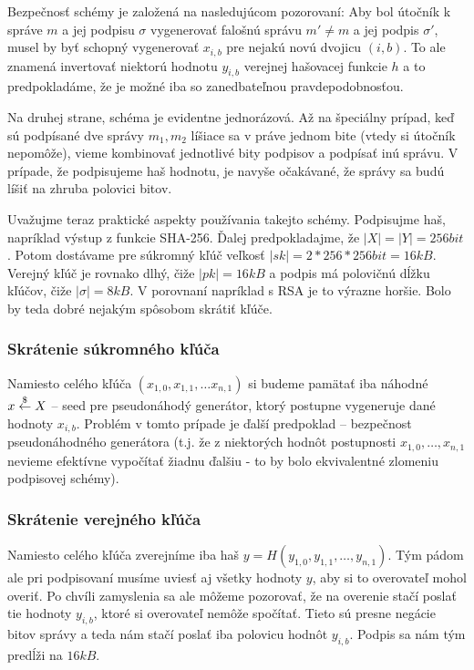 Bezpečnosť schémy je založená na nasledujúcom pozorovaní:
Aby bol útočník k správe $m$ a jej podpisu $\sigma$ vygenerovať
falošnú správu $m' \ne m$ a jej podpis $\sigma'$, musel by byť schopný
vygenerovať $x_{i,b}$ pre nejakú novú dvojicu $(i,b)$.
To ale znamená invertovať niektorú hodnotu $y_{i,b}$ verejnej
hašovacej funkcie $h$ a to predpokladáme, že je možné iba so zanedbateľnou
pravdepodobnosťou.

Na druhej strane, schéma je evidentne jednorázová.
Až na špeciálny prípad, keď sú podpísané dve správy $m_1,m_2$ líšiace
sa v práve jednom bite (vtedy si útočník nepomôže), vieme kombinovať
jednotlivé bity podpisov a podpísať inú správu. V prípade, že
podpisujeme haš hodnotu, je navyše očakávané, že správy sa budú líšiť
na zhruba polovici bitov.

\medskip
Uvažujme teraz praktické aspekty používania takejto schémy. Podpisujme
haš, napríklad výstup z funkcie SHA-256. Ďalej predpokladajme, že
$|X|=|Y|=256 \unit{bit}$. Potom dostávame pre súkromný kľúč veľkosť
$|sk|=2*256*256 \unit{bit} =16 \unit{kB}$. Verejný kľúč je rovnako dlhý, čiže
$|pk|=16 \unit{kB}$ a podpis má polovičnú dĺžku kľúčov, čiže $|\sigma|=8
\unit{kB}$.
V porovnaní napríklad s RSA je to výrazne horšie. Bolo by teda dobré
nejakým spôsobom skrátiť kľúče.

\subsubsection{Skrátenie súkromného kľúča}

Namiesto celého kľúča $(x_{1,0}, x_{1,1},
\ldots x_{n,1})$ si budeme pamätať iba náhodné $x \overset{\$}{\leftarrow} X$ -- seed pre
pseudonáhodý generátor, ktorý postupne vygeneruje dané hodnoty
$x_{i,b}$. Problém v tomto prípade je ďalší predpoklad -- bezpečnost
pseudonáhodného generátora (t.j. že z niektorých hodnôt postupnosti
$x_{1,0}, \ldots, x_{n,1}$ nevieme efektívne vypočítať žiadnu ďalšiu -
to by bolo ekvivalentné zlomeniu podpisovej schémy).

\subsubsection{Skrátenie verejného kľúča}
Namiesto celého kľúča zverejníme iba haš
$y=H(y_{1,0},y_{1,1},\ldots,y_{n,1})$. Tým pádom ale pri podpisovaní
musíme uviesť aj všetky hodnoty $y$, aby si to overovateľ mohol
overiť. Po chvíli zamyslenia sa ale môžeme pozorovať, že na overenie
stačí poslať tie hodnoty $y_{i,b}$, ktoré si overovateľ nemôže
spočítať. Tieto sú presne negácie bitov správy a teda nám stačí poslať
iba polovicu hodnôt $y_{i,b}$. Podpis sa nám tým predĺži na $16
\unit{kB}$.

